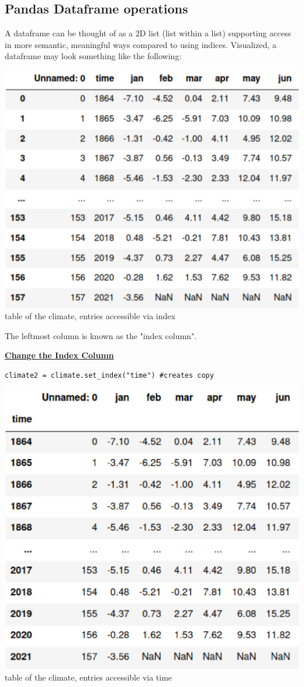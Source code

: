 \subsection*{Pandas Dataframe operations}
A dataframe can be thought of as a 2D list (list within a list) supporting access in more semantic, meaningful ways compared to using indices. Visualized, a dataframe may look something like the following: 

{\centering
\includegraphics[width=0.8\linewidth]{src/4_pandas/images/pd_dataframe_index.png}\\
table of the climate, entries accessible via index \par}

The leftmost column is known as the "index column".  

{\centering\underline{\textbf{Change the Index Column}} \par}
\begin{lstlisting}
climate2 = climate.set_index("time") #creates copy
\end{lstlisting}
{\centering
\includegraphics[width = 0.8\linewidth]{src/4_pandas/images/pd_dataframe_time.png}\\
table of the climate, entries accessible via time \par}

